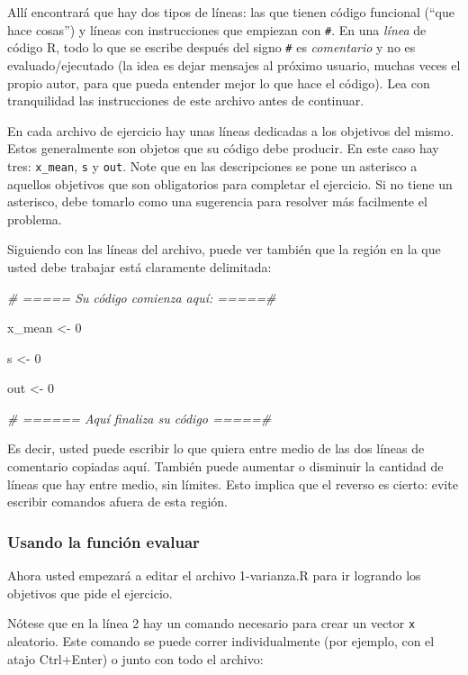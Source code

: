 \documentclass[]{article}
\newenvironment{Shaded}{}{}
\newcommand{\DecValTok}[1]{\textcolor[rgb]{0.25,0.63,0.44}{{#1}}}
\newcommand{\CommentTok}[1]{\textcolor[rgb]{0.38,0.63,0.69}{\textit{{#1}}}}
\newcommand{\NormalTok}[1]{{#1}}
\begin{document}
Allí encontrará que hay dos tipos de líneas: las que tienen código
funcional (``que hace cosas'') y líneas con instrucciones que empiezan
con \texttt{\#}. En una \emph{línea} de código R, todo lo que se escribe
después del signo \texttt{\#} es \emph{comentario} y no es
evaluado/ejecutado (la idea es dejar mensajes al próximo usuario, muchas
veces el propio autor, para que pueda entender mejor lo que hace el
código). Lea con tranquilidad las instrucciones de este archivo antes de
continuar.

En cada archivo de ejercicio hay unas líneas dedicadas a los objetivos
del mismo. Estos generalmente son objetos que su código debe producir.
En este caso hay tres: \texttt{x\_mean}, \texttt{s} y \texttt{out}. Note
que en las descripciones se pone un asterisco a aquellos objetivos que
son obligatorios para completar el ejercicio. Si no tiene un asterisco,
debe tomarlo como una sugerencia para resolver más facilmente el
problema.

Siguiendo con las líneas del archivo, puede ver también que la región en
la que usted debe trabajar está claramente delimitada:

\begin{Shaded}
\begin{Highlighting}[]
\CommentTok{# ===== Su código comienza aquí: =====#}

\NormalTok{x_mean <- }\DecValTok{0}

\NormalTok{s <- }\DecValTok{0}

\NormalTok{out <- }\DecValTok{0}

\CommentTok{# ====== Aquí finaliza su código =====#}
\end{Highlighting}
\end{Shaded}
Es decir, usted puede escribir lo que quiera entre medio de las dos
líneas de comentario copiadas aquí. También puede aumentar o disminuir
la cantidad de líneas que hay entre medio, sin límites. Esto implica que
el reverso es cierto: evite escribir comandos afuera de esta región.

\subsubsection{Usando la función evaluar}

Ahora usted empezará a editar el archivo 1-varianza.R para ir logrando
los objetivos que pide el ejercicio.

Nótese que en la línea 2 hay un comando necesario para crear un vector
\texttt{x} aleatorio. Este comando se puede correr individualmente (por
ejemplo, con el atajo Ctrl+Enter) o junto con todo el archivo:
\end{document}
